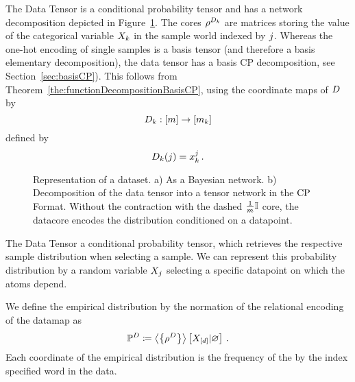 The Data Tensor is a conditional probability tensor and has a network decomposition depicted in Figure~\ref{fig:DataDecomposition}.
The cores $\rho^{D_{k}}$ are matrices storing the value of the categorical variable $X_{k}$ in the sample world indexed by $j$.
Whereas the one-hot encoding of single samples is a basis tensor (and therefore a basis elementary decomposition), the data tensor has a basis CP decomposition, see Section~\ref{sec:basisCP}).
This follows from Theorem~\ref{the:functionDecompositionBasisCP}, using the coordinate maps of $D$ by
	\[ D_{k} : [m] \rightarrow [m_{k}] \]
defined by
	\[  D_{k}(j) = x_{k}^j \, .  \]

\begin{figure}[h]\label{fig:}
\begin{center}
	
\end{center}
\caption{
	Representation of a dataset.
	a) As a Bayesian network.
	b) Decomposition of the data tensor into a tensor network in the $\mathrm{CP}$ Format.
	Without the contraction with the dashed $\frac{1}{m}\mathbb{I}$ core, the datacore encodes the distribution conditioned on a datapoint. }
\label{fig:DataDecomposition}
\end{figure}


The Data Tensor a conditional probability tensor, which retrieves the respective sample distribution when selecting a sample.
We can represent this probability distribution by a random variable $X_{j}$ selecting a specific datapoint on which the atoms depend.

We define the empirical distribution by the normation of the relational encoding of the datamap as
\begin{align*}
	\mathbb{P}^{D} 
	\coloneqq \left\langle \left\{\rho^{D}\right\}\right\rangle \left[ X_{[d]} | \varnothing \right] \, . 
\end{align*}
Each coordinate of the empirical distribution is the frequency of the by the index specified word in the data.

